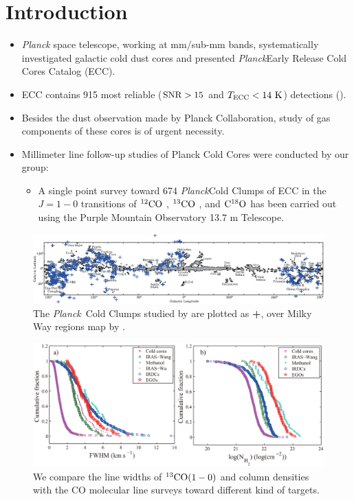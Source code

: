 \documentclass{article}
\newcommand{\coa}{$\rm ^{12}CO$ }
\newcommand{\cob}{$\rm ^{13}CO$ }
\newcommand{\coc}{$\rm C^{18}O$ }
\newcommand{\cobb}{$\rm^{13}CO(1-0)$ }
\newcommand{\Planck}{\emph{Planck}}
\begin{document}
\section{Introduction}
    \begin{itemize}
    \item \emph{Planck} space telescope, working at mm/sub-mm bands, systematically investigated galactic cold dust cores and presented  \Planck Early Release Cold Cores Catalog (ECC).

    \item ECC contains 915 most reliable ($\rm SNR>15$ and $T_{\rm ECC}<14\ \rm K$) detections (\citealt{2011A&A...536A..22P}).

    \item Besides the dust observation made by Planck Collaboration,
        study of gas components of these cores is of urgent necessity.

    \item Millimeter line follow-up studies of Planck Cold Cores were conducted by our group:
    \begin{itemize}
       \item A single point survey toward 674 \Planck Cold Clumps of ECC in the $J=1-0$ transitions of \coa, \cob, and \coc has been carried out using the Purple Mountain Observatory 13.7 m Telescope.
    \end{itemize}
\end{itemize}



\newpage

    \begin{figure}[H]
          \centering
          \includegraphics[totalheight=30 mm]{wu_distribution.eps}
          \caption{\footnotesize The \Planck\  Cold Clumps studied by \citet{2012ApJ...756...76W} are plotted as {\color{blue}\Large{\textbf{+}}}, over Milky Way regions map by \citet{2001ApJ...547..792D}.} \label{fig:wu_distribution}
    \end{figure}
    \begin{figure}[H]\footnotesize
          \centering
          \includegraphics[totalheight=35 mm]{WML_1.eps}
          \caption{\footnotesize We compare the line widths of \cobb and column densities with the CO molecular line surveys toward different kind of targets.}
    \end{figure}
\newpage
\end{document}
